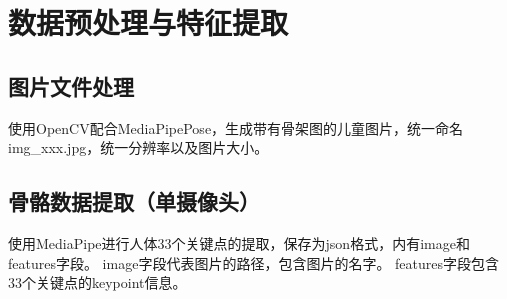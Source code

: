 


\newpage
\section{数据预处理与特征提取}

\subsection{图片文件处理}

使用OpenCV配合MediaPipePose，生成带有骨架图的儿童图片，统一命名img\_xxx.jpg，统一分辨率以及图片大小。

\subsection{骨骼数据提取（单摄像头）}

使用MediaPipe进行人体33个关键点的提取，保存为json格式，内有image和features字段。
image字段代表图片的路径，包含图片的名字。
features字段包含33个关键点的keypoint信息。

